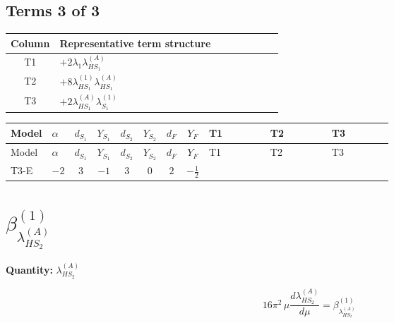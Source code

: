 \documentclass[8pt]{article}
\begin{document}
\begin{landscape}
\subsection*{Terms 3 of 3}
\begin{center}
\begin{tabular}{@{}c >{\raggedright\arraybackslash}p{0.82\linewidth}@{}}
\toprule
Column & Representative term structure \\
\midrule
T1 & \(\displaystyle +2 {\lambda_1} {\lambda_{HS_1}^{(A)}}\) \\
\midrule
T2 & \(\displaystyle +8 {\lambda_{HS_1}^{(1)}} {\lambda_{HS_1}^{(A)}}\) \\
\midrule
T3 & \(\displaystyle +2 {\lambda_{HS_1}^{(A)}} {\lambda_{S_1}^{(1)}}\) \\
\midrule
\bottomrule
\end{tabular}
\end{center}
\smallskip
\tiny
\begin{longtable}{@{}llcccccc >{\raggedright\arraybackslash}p{0.21\linewidth} >{\raggedright\arraybackslash}p{0.21\linewidth} >{\raggedright\arraybackslash}p{0.21\linewidth}@{}}
\toprule
Model & $\alpha$ & $d_{S_1}$ & $Y_{S_1}$ & $d_{S_2}$ & $Y_{S_2}$ & $d_F$ & $Y_F$ & T1 & T2 & T3 \\
\midrule
\endfirsthead
\toprule
Model & $\alpha$ & $d_{S_1}$ & $Y_{S_1}$ & $d_{S_2}$ & $Y_{S_2}$ & $d_F$ & $Y_F$ & T1 & T2 & T3 \\
\midrule
\endhead
T3-E & $-2$ & $3$ & $-1$ & $3$ & $0$ & $2$ & $-\frac{1}{2}$ & \scriptsize\adjustbox{max width=\linewidth}{$\begin{gathered} +2 {\lambda_1} {\lambda_{HS_1}^{(A)}}\end{gathered}$} & \scriptsize\adjustbox{max width=\linewidth}{$\begin{gathered} +8 {\lambda_{HS_1}^{(1)}} {\lambda_{HS_1}^{(A)}}\end{gathered}$} & \scriptsize\adjustbox{max width=\linewidth}{$\begin{gathered} +2 {\lambda_{HS_1}^{(A)}} {\lambda_{S_1}^{(1)}}\end{gathered}$} \\
\midrule
\bottomrule
\end{longtable}
\clearpage
\section*{$\beta_{\lambda_{HS_2}^{(A)}}^{(1)}$}
\noindent\textbf{Quantity: }$\lambda_{HS_2}^{(A)}$\par\smallskip
\[16\pi^2\,\mu\frac{d \lambda_{HS_2}^{(A)}}{d\mu}=\beta_{\lambda_{HS_2}^{(A)}}^{(1)}\]

\end{landscape}
\end{document}
